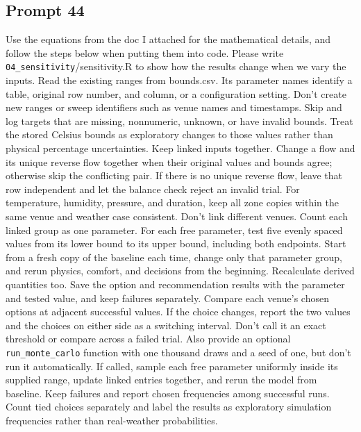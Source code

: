 \subsection*{Prompt 44}
Use the equations from the doc I attached for the mathematical details, and follow the steps below when putting them into code. Please write \nolinkurl{04_sensitivity}/sensitivity.R to show how the results change when we vary the inputs. Read the existing ranges from bounds.csv. Its parameter names identify a table, original row number, and column, or a configuration setting. Don’t create new ranges or sweep identifiers such as venue names and timestamps.
Skip and log targets that are missing, nonnumeric, unknown, or have invalid bounds. Treat the stored Celsius bounds as exploratory changes to those values rather than physical percentage uncertainties.
Keep linked inputs together. Change a flow and its unique reverse flow together when their original values and bounds agree; otherwise skip the conflicting pair. If there is no unique reverse flow, leave that row independent and let the balance check reject an invalid trial. For temperature, humidity, pressure, and duration, keep all zone copies within the same venue and weather case consistent. Don’t link different venues. Count each linked group as one parameter.
For each free parameter, test five evenly spaced values from its lower bound to its upper bound, including both endpoints. Start from a fresh copy of the baseline each time, change only that parameter group, and rerun physics, comfort, and decisions from the beginning. Recalculate derived quantities too. Save the option and recommendation results with the parameter and tested value, and keep failures separately.
Compare each venue’s chosen options at adjacent successful values. If the choice changes, report the two values and the choices on either side as a switching interval. Don’t call it an exact threshold or compare across a failed trial.
Also provide an optional \nolinkurl{run_monte_carlo} function with one thousand draws and a seed of one, but don’t run it automatically. If called, sample each free parameter uniformly inside its supplied range, update linked entries together, and rerun the model from baseline. Keep failures and report chosen frequencies among successful runs. Count tied choices separately and label the results as exploratory simulation frequencies rather than real-weather probabilities.

